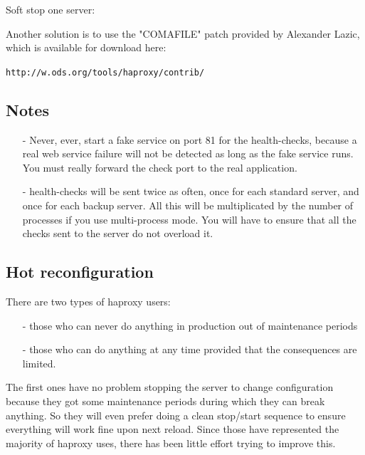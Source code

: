 Soft stop one server:

Another solution is to use the "COMAFILE" patch provided by Alexander Lazic,
which is available for download here:

   \verb|http://w.ods.org/tools/haproxy/contrib/|

\subsection{Notes}

\begin{itemize}
\item[-] Never, ever, start a fake service on port 81 for the health-checks, because
    a real web service failure will not be detected as long as the fake service
    runs. You must really forward the check port to the real application.

\item[-] health-checks will be sent twice as often, once for each standard server,
    and once for each backup server. All this will be multiplicated by the
    number of processes if you use multi-process mode. You will have to ensure
    that all the checks sent to the server do not overload it.
\end{itemize}

\subsection{Hot reconfiguration}

There are two types of haproxy users:
\begin{itemize}
\item[-] those who can never do anything in production out of maintenance periods
\item[-] those who can do anything at any time provided that the consequences are limited.
\end{itemize}

The first ones have no problem stopping the server to change configuration
because they got some maintenance periods during which they can break anything.
So they will even prefer doing a clean stop/start sequence to ensure everything
will work fine upon next reload. Since those have represented the majority of
haproxy uses, there has been little effort trying to improve this.

